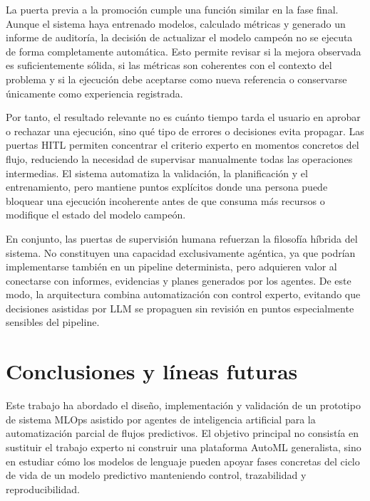 \documentclass[12pt,a4paper]{article}
\theoremstyle{plain}
\begin{document}
La puerta previa a la promoción cumple una función similar en la fase final. Aunque el sistema haya entrenado modelos, calculado métricas y generado un informe de auditoría, la decisión de actualizar el modelo campeón no se ejecuta de forma completamente automática. Esto permite revisar si la mejora observada es suficientemente sólida, si las métricas son coherentes con el contexto del problema y si la ejecución debe aceptarse como nueva referencia o conservarse únicamente como experiencia registrada.

Por tanto, el resultado relevante no es cuánto tiempo tarda el usuario en aprobar o rechazar una ejecución, sino qué tipo de errores o decisiones evita propagar. Las puertas HITL permiten concentrar el criterio experto en momentos concretos del flujo, reduciendo la necesidad de supervisar manualmente todas las operaciones intermedias. El sistema automatiza la validación, la planificación y el entrenamiento, pero mantiene puntos explícitos donde una persona puede bloquear una ejecución incoherente antes de que consuma más recursos o modifique el estado del modelo campeón.

En conjunto, las puertas de supervisión humana refuerzan la filosofía híbrida del sistema. No constituyen una capacidad exclusivamente agéntica, ya que podrían implementarse también en un pipeline determinista, pero adquieren valor al conectarse con informes, evidencias y planes generados por los agentes. De este modo, la arquitectura combina automatización con control experto, evitando que decisiones asistidas por LLM se propaguen sin revisión en puntos especialmente sensibles del pipeline.

\newpage

\section{Conclusiones y líneas futuras}
\label{sec:conclusiones}

Este trabajo ha abordado el diseño, implementación y validación de un prototipo de sistema MLOps asistido por agentes de inteligencia artificial para la automatización parcial de flujos predictivos. El objetivo principal no consistía en sustituir el trabajo experto ni construir una plataforma AutoML generalista, sino en estudiar cómo los modelos de lenguaje pueden apoyar fases concretas del ciclo de vida de un modelo predictivo manteniendo control, trazabilidad y reproducibilidad.
\end{document}

